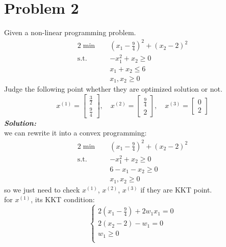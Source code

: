\documentclass[paper=a4, fontsize=11pt]{scrartcl} %
\numberwithin{equation}{section} %
\numberwithin{figure}{section} %
\numberwithin{table}{section} %
\begin{document}
\section{Problem 2}
Given a non-linear programming problem.
\begin{alignat}{2}          \nonumber
\min\quad & (x_1-\frac{9}{4})^2+(x_2-2)^2 \\    \nonumber
\mbox{s.t.}\quad            \nonumber
& -x_1^2+x_2 \geq 0\\        \nonumber
& x_1+x_2 \leq 6\\         \nonumber
& x_1,x_2 \geq 0
\end{alignat}
Judge the following point whether they are optimized solution or not.\\
\begin{equation}
x^{(1)}=\begin{bmatrix} \frac{3}{2} \\ \frac{9}{4}\end{bmatrix}, \quad
x^{(2)}=\begin{bmatrix} \frac{9}{4} \\ 2\end{bmatrix}, \quad
x^{(3)}=\begin{bmatrix} 0 \\ 2\end{bmatrix} \nonumber
\end{equation}
\emph{\textbf{Solution:}}\\
we can rewrite it into a convex programming:\\
\begin{alignat}{2}          \nonumber
\min\quad & (x_1-\frac{9}{4})^2+(x_2-2)^2 \\    \nonumber
\mbox{s.t.}\quad            \nonumber
& -x_1^2+x_2 \geq 0\\        \nonumber
& 6-x_1-x_2 \geq 0\\         \nonumber
& x_1,x_2 \geq 0
\end{alignat}
so we just need to check $x^{(1)}$, $x^{(2)}$, $x^{(3)}$ if they are KKT point.\\
for $x^{(1)}$, its KKT condition:\\
\begin{equation}
\left\{
\begin{aligned}
2(x_1-\frac{9}{4})+2w_1x_1 =0\\
2(x_2-2) - w_1 = 0\\
w_1 \geq 0\\
\end{aligned}
\right. \nonumber
\end{equation}
\end{document}
